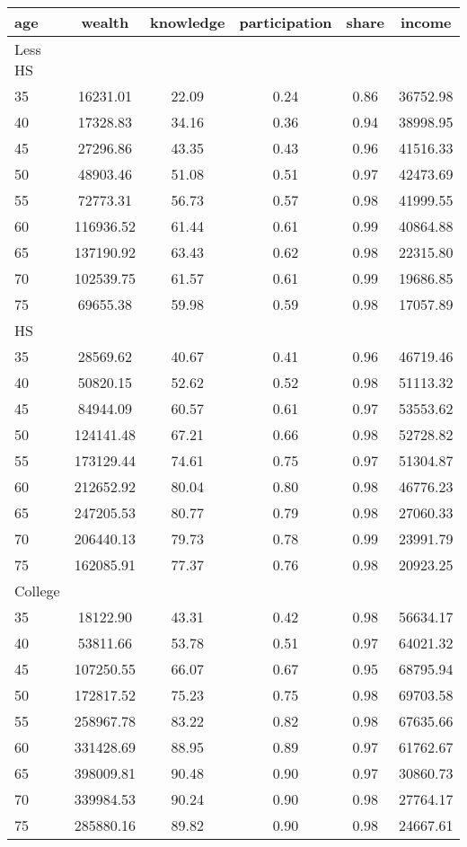  \begin{tabular}{lccccc}
 \hline \hline
  age & wealth & knowledge & participation & share & income \\
 \hline
 Less HS & & & & & \\
 \hline
35 &  16231.01 &     22.09 &      0.24 &      0.86 &  36752.98 \\ 
40 &  17328.83 &     34.16 &      0.36 &      0.94 &  38998.95 \\ 
45 &  27296.86 &     43.35 &      0.43 &      0.96 &  41516.33 \\ 
50 &  48903.46 &     51.08 &      0.51 &      0.97 &  42473.69 \\ 
55 &  72773.31 &     56.73 &      0.57 &      0.98 &  41999.55 \\ 
60 & 116936.52 &     61.44 &      0.61 &      0.99 &  40864.88 \\ 
65 & 137190.92 &     63.43 &      0.62 &      0.98 &  22315.80 \\ 
70 & 102539.75 &     61.57 &      0.61 &      0.99 &  19686.85 \\ 
75 &  69655.38 &     59.98 &      0.59 &      0.98 &  17057.89 \\ 
 \hline
 HS & & & & & \\
 \hline
35 &  28569.62 &     40.67 &      0.41 &      0.96 &  46719.46 \\ 
40 &  50820.15 &     52.62 &      0.52 &      0.98 &  51113.32 \\ 
45 &  84944.09 &     60.57 &      0.61 &      0.97 &  53553.62 \\ 
50 & 124141.48 &     67.21 &      0.66 &      0.98 &  52728.82 \\ 
55 & 173129.44 &     74.61 &      0.75 &      0.97 &  51304.87 \\ 
60 & 212652.92 &     80.04 &      0.80 &      0.98 &  46776.23 \\ 
65 & 247205.53 &     80.77 &      0.79 &      0.98 &  27060.33 \\ 
70 & 206440.13 &     79.73 &      0.78 &      0.99 &  23991.79 \\ 
75 & 162085.91 &     77.37 &      0.76 &      0.98 &  20923.25 \\ 
 \hline
 College & & & & & \\
 \hline
35 &  18122.90 &     43.31 &      0.42 &      0.98 &  56634.17 \\ 
40 &  53811.66 &     53.78 &      0.51 &      0.97 &  64021.32 \\ 
45 & 107250.55 &     66.07 &      0.67 &      0.95 &  68795.94 \\ 
50 & 172817.52 &     75.23 &      0.75 &      0.98 &  69703.58 \\ 
55 & 258967.78 &     83.22 &      0.82 &      0.98 &  67635.66 \\ 
60 & 331428.69 &     88.95 &      0.89 &      0.97 &  61762.67 \\ 
65 & 398009.81 &     90.48 &      0.90 &      0.97 &  30860.73 \\ 
70 & 339984.53 &     90.24 &      0.90 &      0.98 &  27764.17 \\ 
75 & 285880.16 &     89.82 &      0.90 &      0.98 &  24667.61 \\ 
 \hline \hline
 \end{tabular}
